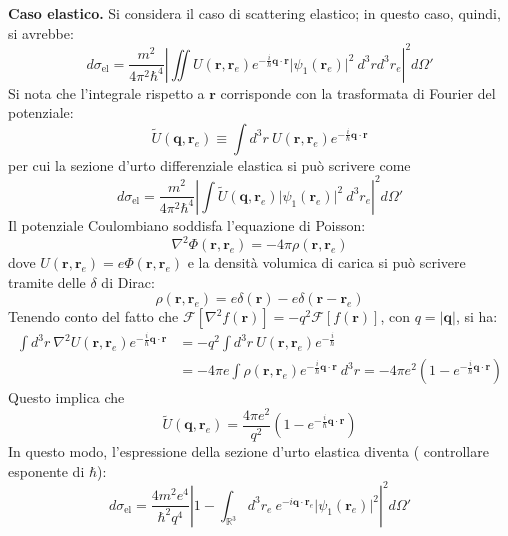 \documentclass[11pt, a4paper]{scrartcl} %
\numberwithin{equation}{subsection}
\theoremstyle{style2}
\theoremstyle{style1}
\begin{document}
\vspace{.5cm}
\noindent 	\textbf{\sffamily Caso elastico. } Si considera il caso di scattering elastico; in questo caso, quindi, si avrebbe:
		\[
d\sigma  _\text{el}= \frac{m^2}{4\pi^2 \hbar ^4}  \left\lvert \iint U(\mathbf{r} ,\mathbf{r} _e) e^{-\frac{i}{\hbar } \mathbf{q} \cdot \mathbf{r} } \lvert \psi _1 (\mathbf{r} _e) \rvert ^2\  d^3 r d^3 r_e\right\rvert ^2 d\Omega '
		\] 
	Si nota che l'integrale rispetto a $\mathbf{r} $ corrisponde con la trasformata di Fourier del potenziale:
	\[
	\widetilde{U}(\mathbf{q}, \mathbf{r} _e) \equiv \int d^3 r \ U(\mathbf{r} , \mathbf{r} _e) e^{-\frac{i}{\hbar } \mathbf{q} \cdot \mathbf{r} } 
\] 
per cui la sezione d'urto differenziale elastica si pu\`o scrivere come	
\[
d\sigma _\text{el} = \frac{m^2}{4 \pi^2 \hbar ^4} \left\lvert \int   \widetilde{U}(\mathbf{q} , \mathbf{r} _e) \lvert \psi _1(\mathbf{r} _e) \rvert ^2\  d^3 r_e\right\rvert^2 d\Omega '
\] 
Il potenziale Coulombiano soddisfa l'equazione di Poisson:
\[
\nabla ^2 \Phi (\mathbf{r} ,\mathbf{r} _e) = - 4 \pi \rho (\mathbf{r} ,\mathbf{r} _e)
\] 
dove $U(\mathbf{r} ,\mathbf{r} _e) = e \Phi(\mathbf{r} , \mathbf{r} _e)$ e la densit\`a volumica di carica si pu\`o scrivere tramite delle $\delta $ di Dirac: 
\[
\rho (\mathbf{r} ,\mathbf{r} _e) = e \delta (\mathbf{r} ) - e \delta (\mathbf{r} -\mathbf{r} _e)
\] 
Tenendo conto del fatto che $\mathcal{F} [\nabla ^2 f(\mathbf{r} )] = - q^2 \mathcal{F} [f(\mathbf{r} )]$, con $q = \lvert \mathbf{q}  \rvert $, si ha:
\[
	\begin{split}
		\int d^3 r \ \nabla ^2 U (\mathbf{r} , \mathbf{r} _e) e^{- \frac{i}{\hbar } \mathbf{q} \cdot \mathbf{r} } &= - q^2 \int d^3 r \ U (\mathbf{r} , \mathbf{r} _e) e^{-\frac{i}{\hbar } } \\
															  &= - 4\pi e \int \rho (\mathbf{r} ,\mathbf{r} _e) e^{-\frac{i}{\hbar }\mathbf{q} \cdot \mathbf{r} } \ d^3 r = - 4 \pi e^2 \left(1- e ^{-\frac{i}{\hbar }\mathbf{q} \cdot \mathbf{r} } \right) 
	\end{split}
\] 
Questo implica che 
\[
	\widetilde{U}(\mathbf{q} ,\mathbf{r} _e) = \frac{4\pi e^2}{q^2} \left(1 - e^{-\frac{i}{\hbar } \mathbf{q} \cdot \mathbf{r} } \right) 
\] 
In questo modo, l'espressione della sezione d'urto elastica diventa ({\color{red} controllare esponente di $\hbar $}):
\begin{equation}\label{sexp}
	d\sigma _\text{el} = \frac{4 m^2 e^4}{\hbar ^2 q^4} \left\lvert 1 - \int_{\mathbb{R}^3} d^3 r_e \ e^{-i\mathbf{q} \cdot \mathbf{r} _e} \lvert \psi _1(\mathbf{r} _e) \rvert ^2\right\rvert ^2 d\Omega '
\end{equation}
\end{document}
